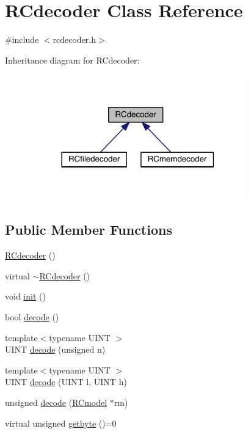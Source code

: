 \hypertarget{class_r_cdecoder}{}\section{R\+Cdecoder Class Reference}
\label{class_r_cdecoder}


{\ttfamily \#include $<$rcdecoder.\+h$>$}



Inheritance diagram for R\+Cdecoder\+:\nopagebreak
\begin{figure}[H]
\begin{center}
\leavevmode
\includegraphics[width=266pt]{dd/d54/class_r_cdecoder__inherit__graph}
\end{center}
\end{figure}
\subsection*{Public Member Functions}
\begin{DoxyCompactItemize}
\item 
\hyperlink{class_r_cdecoder_a0e8fc2ff1c31637f02e12d7b461cfe09}{R\+Cdecoder} ()
\item 
virtual \hyperlink{class_r_cdecoder_ad38c562c10ffb9d77243a89dc868a5b6}{$\sim$\+R\+Cdecoder} ()
\item 
void \hyperlink{class_r_cdecoder_aa670b087f9143ead496a79000b40f0af}{init} ()
\item 
bool \hyperlink{class_r_cdecoder_adf8437ed6727cab2c6eb36f4ff99a778}{decode} ()
\item 
{\footnotesize template$<$typename U\+I\+N\+T $>$ }\\U\+I\+N\+T \hyperlink{class_r_cdecoder_a10afc971cfdb974ce16260c875d36264}{decode} (unsigned n)
\item 
{\footnotesize template$<$typename U\+I\+N\+T $>$ }\\U\+I\+N\+T \hyperlink{class_r_cdecoder_adf81b3c52038b0fe5974b7fcf81c917d}{decode} (U\+I\+N\+T l, U\+I\+N\+T h)
\item 
unsigned \hyperlink{class_r_cdecoder_ac4ce4a9d5ee89f0b99f3ac90c0ed9a45}{decode} (\hyperlink{class_r_cmodel}{R\+Cmodel} $\ast$rm)
\item 
virtual unsigned \hyperlink{class_r_cdecoder_a8ff1adef295c2568e2eb9f3abbb4ac91}{getbyte} ()=0
\end{DoxyCompactItemize}


